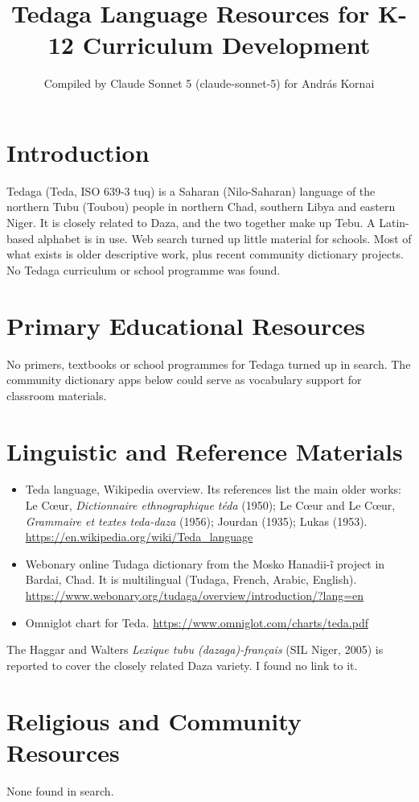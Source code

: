 \documentclass[12pt]{article}
\title{Tedaga Language Resources for K-12 Curriculum Development}
\author{Compiled by Claude Sonnet 5 (claude-sonnet-5) for Andr\'as Kornai}
\date{}
\begin{document}
\maketitle

\section{Introduction}
Tedaga (Teda, ISO 639-3 tuq) is a Saharan (Nilo-Saharan) language of the northern Tubu (Toubou) people in northern Chad, southern Libya and eastern Niger. It is closely related to Daza, and the two together make up Tebu. A Latin-based alphabet is in use. Web search turned up little material for schools. Most of what exists is older descriptive work, plus recent community dictionary projects. No Tedaga curriculum or school programme was found.

\section{Primary Educational Resources}
No primers, textbooks or school programmes for Tedaga turned up in search. The community dictionary apps below could serve as vocabulary support for classroom materials.

\section{Linguistic and Reference Materials}
\begin{itemize}
\item Teda language, Wikipedia overview. Its references list the main older works: Le C\oe{}ur, \emph{Dictionnaire ethnographique t\'eda} (1950); Le C\oe{}ur and Le C\oe{}ur, \emph{Grammaire et textes teda-daza} (1956); Jourdan (1935); Lukas (1953). \url{https://en.wikipedia.org/wiki/Teda_language}
\item Webonary online Tudaga dictionary from the Mosko Hanadii-\~i project in Bardai, Chad. It is multilingual (Tudaga, French, Arabic, English). \url{https://www.webonary.org/tudaga/overview/introduction/?lang=en}
\item Omniglot chart for Teda. \url{https://www.omniglot.com/charts/teda.pdf}
\end{itemize}
The Haggar and Walters \emph{Lexique tubu (dazaga)-fran\c{c}ais} (SIL Niger, 2005) is reported to cover the closely related Daza variety. I found no link to it.

\section{Religious and Community Resources}
None found in search.
\end{document}

